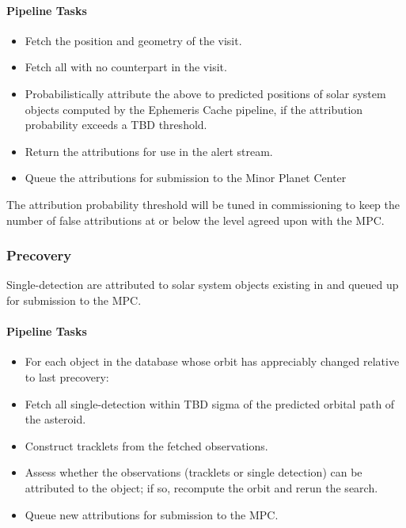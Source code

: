 \paragraph{Pipeline Tasks}

\begin{itemize}
	\item Fetch the position and geometry of the visit.
	\item Fetch all \DIASources with no \DIAObject counterpart in the visit.
	\item Probabilistically attribute the \DIASources above to predicted positions of solar system objects computed by the Ephemeris Cache pipeline, if the attribution probability exceeds a TBD threshold.
	\item Return the attributions for use in the alert stream.
	\item Queue the attributions for submission to the Minor Planet Center
\end{itemize}

The attribution probability threshold will be tuned in commissioning to keep the number of false attributions at or below the level agreed upon with the MPC. %



\subsubsection{Precovery}

Single-detection \DIAObjects are attributed to solar system objects existing in \MPCORB and queued up for submission to the MPC.

\paragraph{Pipeline Tasks}

\begin{itemize}
\item For each object in the \MPCORB database whose orbit has appreciably changed relative to last precovery:
\item Fetch all single-detection \DIAObjects within TBD sigma of the predicted orbital path of the asteroid.
\item Construct tracklets from the fetched observations.
\item Assess whether the observations (tracklets or single detection) can be attributed to the object; if so, recompute the orbit and rerun the search.
\item Queue new attributions for submission to the MPC.
\end{itemize}



